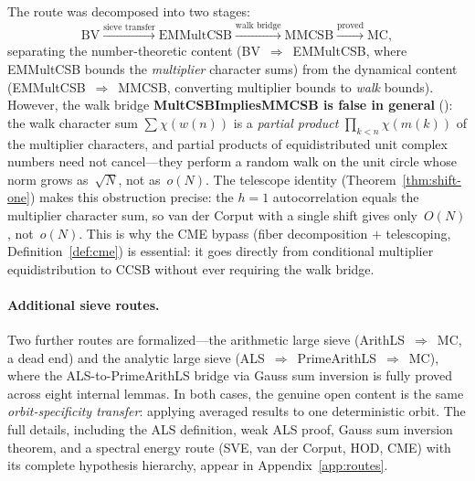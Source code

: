 The route was decomposed into two stages:
\[
\mathrm{BV}
\xrightarrow{\text{sieve transfer}}
\mathrm{EMMultCSB}
\xrightarrow{\text{walk bridge}}
\mathrm{MMCSB}
\xrightarrow{\text{proved}}
\mathrm{MC},
\]
separating the number-theoretic content (BV~$\Rightarrow$~EMMultCSB,
where EMMultCSB bounds the \emph{multiplier} character sums)
from the dynamical content (EMMultCSB~$\Rightarrow$~MMCSB, converting
multiplier bounds to \emph{walk} bounds).  However, the walk bridge
\textbf{MultCSBImpliesMMCSB is false in general}
():
the walk character sum $\sum \chi(w(n))$ is a \emph{partial product}
$\prod_{k<n} \chi(m(k))$ of the multiplier characters, and partial
products of equidistributed unit complex numbers need not cancel---they
perform a random walk on the unit circle whose norm grows as~$\sqrt{N}$,
not as~$o(N)$.  The telescope identity (Theorem~\ref{thm:shift-one})
makes this obstruction precise: the $h\!=\!1$ autocorrelation equals
the multiplier character sum, so van der Corput with a single shift
gives only~$O(N)$, not~$o(N)$.
This is why the CME bypass (fiber decomposition $+$ telescoping,
Definition~\ref{def:cme}) is essential: it goes directly from
conditional multiplier equidistribution to CCSB without ever
requiring the walk bridge.

\paragraph{Additional sieve routes.}
Two further routes are formalized---the arithmetic large sieve
(ArithLS~$\Rightarrow$~MC, a dead end) and the analytic
large sieve (ALS~$\Rightarrow$~PrimeArithLS~$\Rightarrow$~MC), where
the ALS-to-PrimeArithLS bridge via Gauss sum inversion is fully proved
across eight internal lemmas.  In both cases, the genuine open content
is the same \emph{orbit-specificity transfer}: applying averaged
results to one deterministic orbit.  The full details, including the
ALS definition, weak ALS proof, Gauss sum inversion theorem, and a
spectral energy route (SVE, van der Corput, HOD, CME) with its
complete hypothesis hierarchy, appear in Appendix~\ref{app:routes}.

